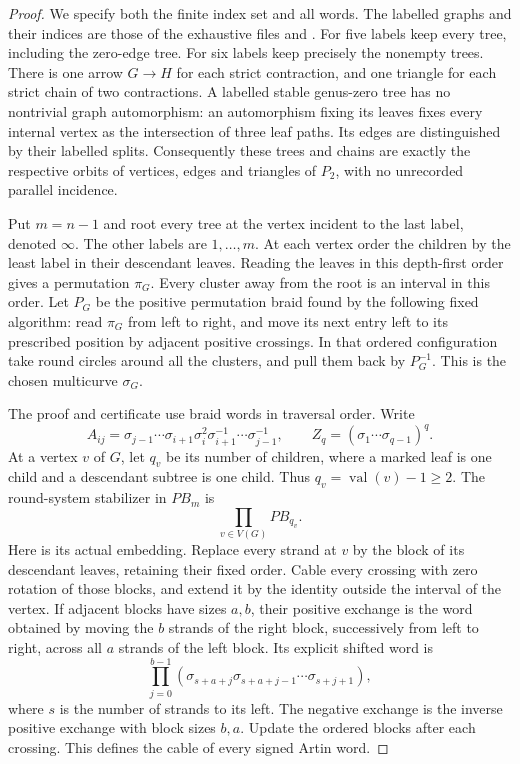 \begin{proof}
We specify both the finite index set and all words.  The labelled
graphs and their indices are those of the exhaustive files
 and
.  For five labels keep every tree,
including the zero-edge tree.  For six labels keep precisely
the nonempty trees.  There is one arrow $G\to H$ for each
strict contraction, and one triangle for each strict chain of
two contractions.  A labelled stable genus-zero tree has no
nontrivial graph automorphism: an automorphism fixing its leaves
fixes every internal vertex as the intersection of three leaf
paths.  Its edges are distinguished by their labelled splits.
Consequently these trees and chains are exactly the respective
orbits of vertices, edges and triangles of $P_2$, with no
unrecorded parallel incidence.

Put $m=n-1$ and root every tree at the vertex incident to the
last label, denoted $\infty$.  The other labels are
$1,\ldots,m$.  At each vertex order the children by the least
label in their descendant leaves.  Reading the leaves in this
depth-first order gives a permutation $\pi_G$.  Every cluster
away from the root is an interval in this order.  Let $P_G$
be the positive permutation braid found by the following fixed
algorithm: read $\pi_G$ from left to right, and move its next
entry left to its prescribed position by adjacent positive
crossings.  In that ordered configuration take round circles
around all the clusters, and pull them back by $P_G^{-1}$.
This is the chosen multicurve $\sigma_G$.

The proof and certificate use braid words in traversal order.
Write
\[
 A_{ij}=\sigma_{j-1}\cdots\sigma_{i+1}\sigma_i^2
          \sigma_{i+1}^{-1}\cdots\sigma_{j-1}^{-1},
 \qquad Z_q=(\sigma_1\cdots\sigma_{q-1})^q.
\]
At a vertex $v$ of $G$, let $q_v$ be its number of children,
where a marked leaf is one child and a descendant subtree is
one child.  Thus $q_v=\operatorname{val}(v)-1\geq2$.
The round-system stabilizer in $PB_m$ is
\[
                  \prod_{v\in V(G)}PB_{q_v}.                 \tag{D.1}
\]
Here is its actual embedding.  Replace every strand at $v$ by
the block of its descendant leaves, retaining their fixed
order.  Cable every crossing with zero rotation of those
blocks, and extend it by the identity outside the interval of
the vertex.  If adjacent blocks have sizes $a,b$, their positive
exchange is the word obtained by moving the $b$ strands of the
right block, successively from left to right, across all $a$
strands of the left block.  Its explicit shifted word is
\[
 \prod_{j=0}^{b-1}
       (\sigma_{s+a+j}\sigma_{s+a+j-1}\cdots\sigma_{s+j+1}),
                                                               \tag{D.2}
\]
where $s$ is the number of strands to its left.  The negative
exchange is the inverse positive exchange with block sizes
$b,a$.  Update the ordered blocks after each crossing.
This defines the cable of every signed Artin word.


\end{proof}
